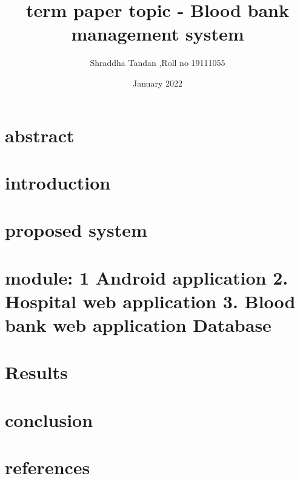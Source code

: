 \documentclass[12pt]{article}
\title{term paper  topic - Blood bank management system}
\author{Shraddha Tandan ,Roll no 19111055}
\date{January 2022}
\begin{document}
\maketitle

\section{abstract }
\section{introduction}
\section{proposed system}
\section*{module: 1 Android application
2. Hospital web application 
3. Blood bank web application 
Database }
\section{Results}
\section{conclusion}
\section{references}
\end{document}
